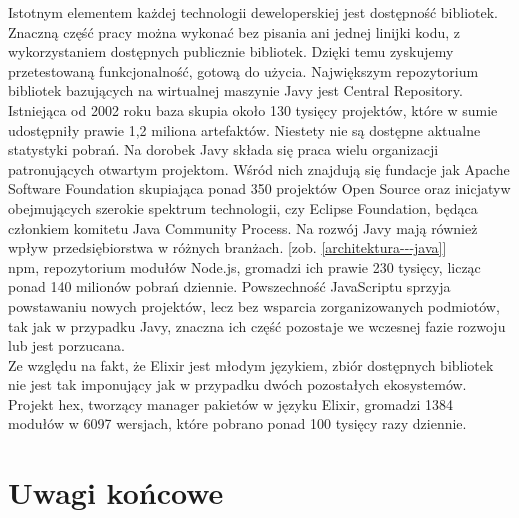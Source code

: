 \documentclass[12pt,twoside]{article}
\begin{document}
Istotnym elementem każdej technologii deweloperskiej jest dostępność
bibliotek. Znaczną część pracy można wykonać bez pisania ani jednej
linijki kodu, z wykorzystaniem dostępnych publicznie bibliotek. Dzięki
temu zyskujemy przetestowaną funkcjonalność, gotową do użycia.
Największym repozytorium bibliotek bazujących na wirtualnej maszynie
Javy jest Central Repository\autocite{centralrepository2015}. Istniejąca
od 2002 roku baza skupia około 130 tysięcy projektów, które w sumie
udostępniły prawie 1,2 miliona artefaktów. Niestety nie są dostępne
aktualne statystyki pobrań.\autocite{centralstats2015} Na dorobek Javy
składa się praca wielu organizacji patronujących otwartym projektom.
Wśród nich znajdują się fundacje jak Apache Software
Foundation\autocite{apachefoundation2015} skupiająca ponad 350 projektów
Open Source oraz inicjatyw obejmujących szerokie spektrum technologii,
czy Eclipse Foundation\autocite{eclipsefoundation2015}, będąca członkiem
komitetu Java Community Process. Na rozwój Javy mają również wpływ
przedsiębiorstwa w różnych branżach. {[}zob.
\ref{architektura---java}{]}\\
npm, repozytorium modułów Node.js, gromadzi ich prawie 230 tysięcy,
licząc ponad 140 milionów pobrań dziennie.\autocite{npm2015}
Powszechność JavaScriptu sprzyja powstawaniu nowych projektów, lecz bez
wsparcia zorganizowanych podmiotów, tak jak w przypadku Javy, znaczna
ich część pozostaje we wczesnej fazie rozwoju lub jest porzucana.\\
Ze względu na fakt, że Elixir jest młodym językiem, zbiór dostępnych
bibliotek nie jest tak imponujący jak w przypadku dwóch pozostałych
ekosystemów. Projekt hex, tworzący manager pakietów w języku Elixir,
gromadzi 1384 modułów w 6097 wersjach, które pobrano ponad 100 tysięcy
razy dziennie.\autocite{hex2015}
\clearpage{}
	\clearpage{}\section{Uwagi końcowe}\label{uwagi-koux144cowe}
\end{document}
